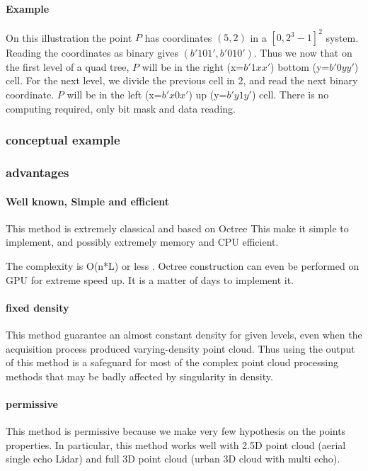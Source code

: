 			\paragraph{Example} 
				 On this illustration the point $P$ has coordinates $(5,2)$ in a $[0,2^3-1]^2$ system. Reading the coordinates as binary gives $(b'101',b'010')$.
				 Thus we now that on the first level of a quad tree, $P$ will be in the right (x=$b'1xx'$) bottom (y=$b'0yy'$) cell.
				 For the next level, we divide the previous cell in 2, and read the next binary coordinate. $P$ will be in the left (x=$b'x0x'$) up (y=$b'y1y'$) cell. There is no computing required, only bit mask and data reading.
				 
		\subsubsection{conceptual example}
			
			
		\subsubsection{advantages}	
			\paragraph{Well known, Simple and efficient}
				This method is extremely classical and based on Octree This make it simple to implement, and possibly extremely memory and CPU efficient.

				The complexity is O(n*L) or less .				
				Octree construction can even be performed on GPU for extreme speed up.
				It is a matter of days to implement it.
			\paragraph{fixed density}
				This method guarantee an almost constant density for given levels, even when the acquisition process produced varying-density point cloud.
				Thus using the output of this method is a safeguard for most of the complex point cloud processing methods that may be badly affected by singularity in density.
			\paragraph{permissive}
				This method is permissive because we make very few hypothesis on the points properties. In particular, this method works well with 2.5D point cloud (aerial single echo Lidar) and full 3D point cloud (urban 3D cloud with multi echo).
